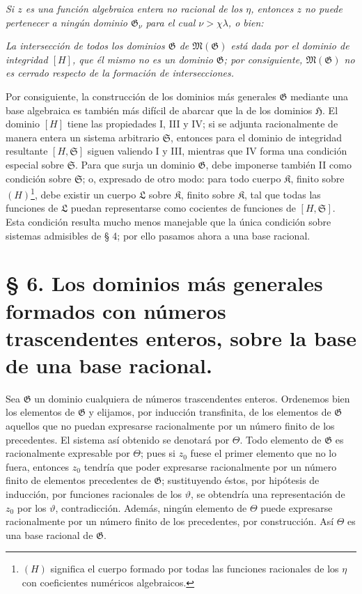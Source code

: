 \documentclass[11pt]{article}
\begin{document}
\emph{Si $z$ es una función algebraica entera no racional de los $\eta$, entonces $z$ no puede pertenecer a ningún dominio $\mathfrak G_\nu$ para el cual $\nu>\chi\lambda$, o bien:}

\emph{La intersección de todos los dominios $\mathfrak G$ de $\mathfrak M(\mathfrak G)$ está dada por el dominio de integridad $[H]$, que él mismo no es un dominio $\mathfrak G$; por consiguiente, $\mathfrak M(\mathfrak G)$ no es cerrado respecto de la formación de intersecciones.}

Por consiguiente, la construcción de los dominios más generales $\mathfrak G$ mediante una base algebraica es también más difícil de abarcar que la de los dominios $\mathfrak H$. El dominio $[H]$ tiene las propiedades I, III y IV; si se adjunta racionalmente de manera entera un sistema arbitrario $\mathfrak S$, entonces para el dominio de integridad resultante $[H,\mathfrak S]$ siguen valiendo I y III, mientras que IV forma una condición especial sobre $\mathfrak S$. Para que surja un dominio $\mathfrak G$, debe imponerse también II como condición sobre $\mathfrak S$; o, expresado de otro modo: para todo cuerpo $\mathfrak K$, finito sobre $(H)$\footnote{$(H)$ significa el cuerpo formado por todas las funciones racionales de los $\eta$ con coeficientes numéricos algebraicos.}, debe existir un cuerpo $\mathfrak L$ sobre $\mathfrak K$, finito sobre $\mathfrak K$, tal que todas las funciones de $\mathfrak L$ puedan representarse como cocientes de funciones de $[H,\mathfrak S]$. Esta condición resulta mucho menos manejable que la única condición sobre sistemas admisibles de § 4; por ello pasamos ahora a una base racional.

\section*{§ 6. Los dominios más generales formados con números trascendentes enteros, sobre la base de una base racional.}

Sea $\mathfrak G$ un dominio cualquiera de números trascendentes enteros. Ordenemos bien los elementos de $\mathfrak G$ y elijamos, por inducción transfinita, de los elementos de $\mathfrak G$ aquellos que no puedan expresarse racionalmente por un número finito de los precedentes. El sistema así obtenido se denotará por $\Theta$. Todo elemento de $\mathfrak G$ es racionalmente expresable por $\Theta$; pues si $z_0$ fuese el primer elemento que no lo fuera, entonces $z_0$ tendría que poder expresarse racionalmente por un número finito de elementos precedentes de $\mathfrak G$; sustituyendo éstos, por hipótesis de inducción, por funciones racionales de los $\vartheta$, se obtendría una representación de $z_0$ por los $\vartheta$, contradicción. Además, ningún elemento de $\Theta$ puede expresarse racionalmente por un número finito de los precedentes, por construcción. Así $\Theta$ es una base racional de $\mathfrak G$.
\end{document}
